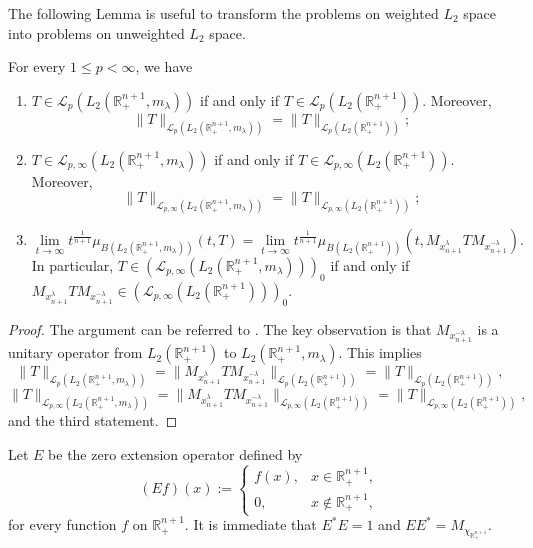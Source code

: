 \documentclass{amsart}
\begin{document}
The following Lemma is useful to transform the problems on weighted $L_2$ space into problems on unweighted $L_2$ space.
\begin{lemma}\label{weight}
For every $1\leq p<\infty$, we have
\begin{enumerate}[{\rm (i)}]
\item $T\in\mathcal{L}_{p}(L_2(\mathbb{R}_+^{n+1},m_\lambda))$ if and only if $T\in\mathcal{L}_{p}(L_2(\mathbb{R}_+^{n+1}))$. Moreover,
$$\|T\|_{\mathcal{L}_{p}(L_2(\mathbb{R}_+^{n+1},m_\lambda))}=\|T\|_ {\mathcal{L}_{p}(L_2(\mathbb{R}_+^{n+1}))};$$
\item $T\in\mathcal{L}_{p,\infty}(L_2(\mathbb{R}_+^{n+1},m_\lambda))$ if and only if $T\in\mathcal{L}_{p,\infty}(L_2(\mathbb{R}_+^{n+1}))$. Moreover,
$$\|T\|_{\mathcal{L}_{p,\infty}(L_2(\mathbb{R}_+^{n+1},m_\lambda))}=\|T\|_ {\mathcal{L}_{p,\infty}(L_2(\mathbb{R}_+^{n+1}))};$$
\item
$$\lim_{t\to\infty}t^{\frac1{n+1}}\mu_{B(L_2(\mathbb{R}^{n+1}_+,m_{\lambda}))}(t,T)=\lim_{t\to\infty}t^{\frac1{n+1}}\mu_{B(L_2(\mathbb{R}^{n+1}_+))}(t,M_{x_{n+1}^\lambda}TM_{x_{n+1}^{-\lambda}}).$$
In particular, $T\in(\mathcal{L}_{p,\infty}(L_2(\mathbb{R}_+^{n+1},m_\lambda)))_0$ if and only if $M_{x_{n+1}^\lambda}TM_{x_{n+1}^{-\lambda}}\in(\mathcal{L}_{p,\infty}(L_2(\mathbb{R}_+^{n+1})))_0$.
\end{enumerate}
\end{lemma}
\begin{proof}
The argument can be referred to \cite[Lemma 2.7]{MR4706933}. The key observation is that $M_{x_{n+1}^{-\lambda}}$ is a unitary operator from $L_2(\mathbb{R}_+^{n+1})$ to $L_2(\mathbb{R}_+^{n+1},m_\lambda)$. This implies
$$\|T\|_{\mathcal{L}_{p}(L_2(\mathbb{R}_+^{n+1},m_\lambda))}=\|M_{x_{n+1}^\lambda}TM_{x_{n+1}^{-\lambda}}\|_ {\mathcal{L}_{p}(L_2(\mathbb{R}_+^{n+1}))}=\|T\|_ {\mathcal{L}_{p}(L_2(\mathbb{R}_+^{n+1}))},$$
$$\|T\|_{\mathcal{L}_{p,\infty}(L_2(\mathbb{R}_+^{n+1},m_\lambda))}=\|M_{x_{n+1}^\lambda}TM_{x_{n+1}^{-\lambda}}\|_ {\mathcal{L}_{p,\infty}(L_2(\mathbb{R}_+^{n+1}))}=\|T\|_ {\mathcal{L}_{p,\infty}(L_2(\mathbb{R}_+^{n+1}))},$$
and the third statement.
\end{proof}

Let $E$ be the zero extension operator defined by
$$(Ef)(x):=\begin{cases}
f(x),& x\in \mathbb{R}_+^{n+1},\\
0,& x\notin \mathbb{R}_+^{n+1},
\end{cases}
$$
for every function $f$ on $\mathbb{R}_+^{n+1}.$ It is immediate that $E^{\ast}E=1$ and $EE^{\ast}=M_{\chi_{\mathbb{R}_+^{n+1}}}.$
\end{document}
